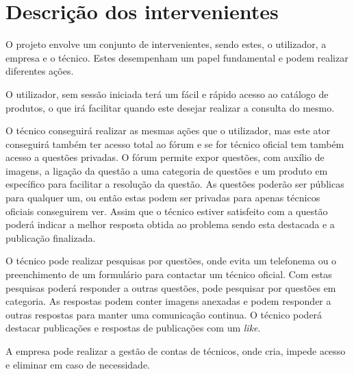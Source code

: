 \section{Descrição dos intervenientes}
O projeto envolve um conjunto de intervenientes, sendo estes, o utilizador, a empresa e o técnico. Estes desempenham um papel fundamental e podem realizar diferentes ações.

O utilizador, sem sessão iniciada terá um fácil e rápido acesso ao catálogo de produtos, o que irá facilitar quando este desejar realizar a consulta do mesmo.

O técnico conseguirá realizar as mesmas ações que o utilizador, mas este ator conseguirá também ter acesso total ao fórum e se for técnico oficial tem também acesso a questões privadas. O fórum permite expor questões, com auxílio de imagens, a ligação da questão a uma categoria de questões e um produto em específico para facilitar a resolução da questão. As questões poderão ser públicas para qualquer um, ou então estas podem ser privadas para apenas técnicos oficiais conseguirem ver. Assim que o técnico estiver satisfeito com a questão poderá indicar a melhor resposta obtida ao problema sendo esta destacada e a publicação finalizada.

O técnico pode realizar pesquisas por questões, onde evita um telefonema ou o preenchimento de um formulário para contactar um técnico oficial. Com estas pesquisas poderá responder a outras questões, pode pesquisar por questões em categoria. As respostas podem conter imagens anexadas e podem responder a outras respostas para manter uma comunicação continua. O técnico poderá destacar publicações e respostas de publicações com um \textit{like}.

A empresa pode realizar a gestão de contas de técnicos, onde cria, impede acesso e 
eliminar em caso de necessidade.
